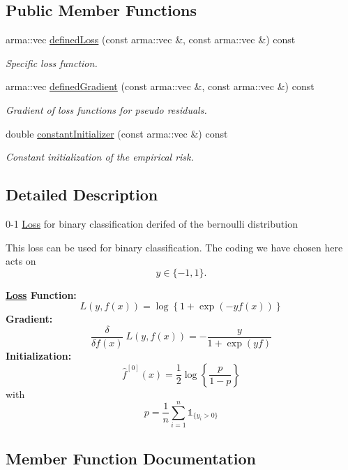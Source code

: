 \subsection*{Public Member Functions}
\begin{DoxyCompactItemize}
\item 
arma\+::vec \mbox{\hyperlink{classloss_1_1_bernoulli_loss_a1e347cacc5a5925874f579834f421236}{defined\+Loss}} (const arma\+::vec \&, const arma\+::vec \&) const
\begin{DoxyCompactList}\small\item\em Specific loss function. \end{DoxyCompactList}\item 
arma\+::vec \mbox{\hyperlink{classloss_1_1_bernoulli_loss_a2dc644172cea3eb84f1af5aa9217c04a}{defined\+Gradient}} (const arma\+::vec \&, const arma\+::vec \&) const
\begin{DoxyCompactList}\small\item\em Gradient of loss functions for pseudo residuals. \end{DoxyCompactList}\item 
double \mbox{\hyperlink{classloss_1_1_bernoulli_loss_a1b5e26f446f30d690abc625349f563d1}{constant\+Initializer}} (const arma\+::vec \&) const
\begin{DoxyCompactList}\small\item\em Constant initialization of the empirical risk. \end{DoxyCompactList}\end{DoxyCompactItemize}


\subsection{Detailed Description}
0-\/1 \mbox{\hyperlink{classloss_1_1_loss}{Loss}} for binary classification derifed of the bernoulli distribution 

This loss can be used for binary classification. The coding we have chosen here acts on \[ y \in \{-1, 1\}. \]

{\bfseries \mbox{\hyperlink{classloss_1_1_loss}{Loss}} Function\+:} \[ L(y, f(x)) = \log\left\{1 + \exp\left(-yf(x)\right)\right\} \] {\bfseries Gradient\+:} \[ \frac{\delta}{\delta f(x)}\ L(y, f(x)) = - \frac{y}{1 + \exp\left(yf\right)} \] {\bfseries Initialization\+:} \[ \hat{f}^{[0]}(x) = \frac{1}{2}\log\left\{\frac{p}{1 - p}\right\} \] with \[ p = \frac{1}{n}\sum\limits_{i=1}^n\mathbb{1}_{\{y_i > 0\}} \] 

\subsection{Member Function Documentation}
\mbox{\label{classloss_1_1_bernoulli_loss_a1b5e26f446f30d690abc625349f563d1}} 
